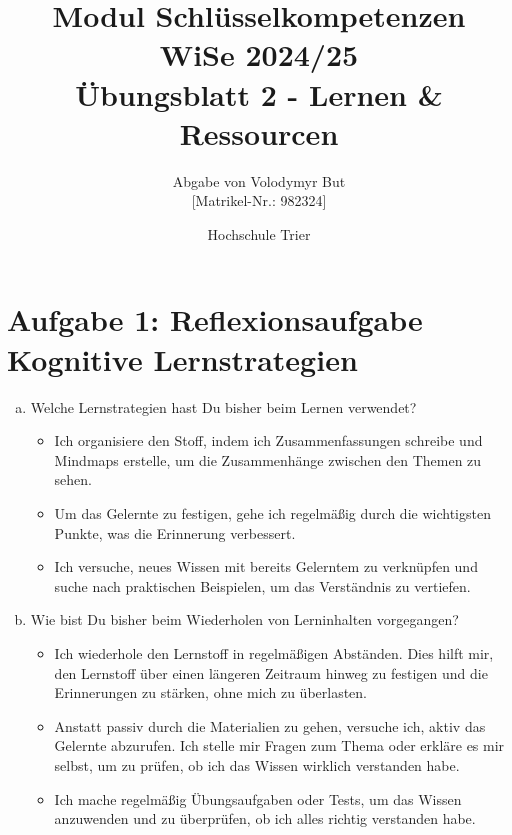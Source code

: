 \documentclass[10pt, oneside]{article}
\title{Modul Schl{\"u}sselkompetenzen\\[10pt]\Large{WiSe 2024/25}\\[15pt]\Large{{\"U}bungsblatt 2 - Lernen \& Ressourcen}}
\author{Abgabe von Volodymyr But\\[5pt][Matrikel-Nr.: 982324]}
\date{Hochschule Trier}
\begin{document}
\maketitle
\vspace{25px}

\section{Aufgabe 1: Reflexionsaufgabe Kognitive Lernstrategien}
\begin{enumerate}[(a)]
    \item Welche Lernstrategien hast Du bisher beim Lernen verwendet?

        \begin{itemize}
            \item Ich organisiere den Stoff, indem ich Zusammenfassungen
                schreibe und Mindmaps erstelle, um die Zusammenhänge zwischen
                den Themen zu sehen.
            \item Um das Gelernte zu festigen, gehe ich regelmäßig durch die wichtigsten
                Punkte, was die Erinnerung verbessert.
            \item Ich versuche, neues Wissen mit bereits Gelerntem zu
                verknüpfen und suche nach praktischen Beispielen, um das
                Verständnis zu vertiefen.
        \end{itemize}

    \item Wie bist Du bisher beim Wiederholen von Lerninhalten vorgegangen?

        \begin{itemize}
            \item Ich wiederhole den Lernstoff in regelmäßigen Abständen. Dies
                hilft mir, den Lernstoff über einen längeren Zeitraum hinweg zu
                festigen und die Erinnerungen zu stärken, ohne mich zu
                überlasten.
            \item Anstatt passiv durch die Materialien zu gehen, versuche ich,
                aktiv das Gelernte abzurufen. Ich stelle mir Fragen zum Thema
                oder erkläre es mir selbst, um zu prüfen, ob ich das Wissen
                wirklich verstanden habe.
            \item Ich mache regelmäßig Übungsaufgaben oder Tests, um das
                Wissen anzuwenden und zu überprüfen, ob ich alles richtig
                verstanden habe.
        \end{itemize}


\end{enumerate}
\end{document}
